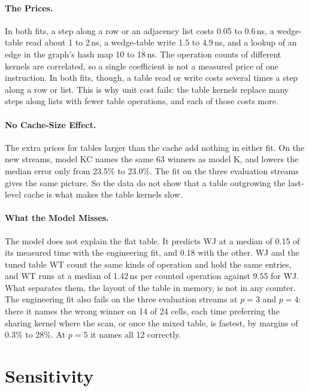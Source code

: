 \paragraph{The Prices.}
In both fits, a step along a row or an adjacency list costs 0.05 to 0.6\,ns, a wedge-table read about 1 to 2\,ns, a wedge-table write 1.5 to 4.9\,ns, and a lookup of an edge in the graph's hash map 10 to 18\,ns.
The operation counts of different kernels are correlated, so a single coefficient is not a measured price of one instruction.
In both fits, though, a table read or write costs several times a step along a row or list. This is why unit cost fails: the table kernels replace many steps along lists with fewer table operations, and each of those costs more.

\paragraph{No Cache-Size Effect.}
The extra prices for tables larger than the cache add nothing in either fit.
On the new streams, model KC names the same 63 winners as model K, and lowers the median error only from 23.5\% to 23.0\%.
The fit on the three evaluation streams gives the same picture.
So the data do not show that a table outgrowing the last-level cache is what makes the table kernels slow.

\paragraph{What the Model Misses.}
The model does not explain the flat table.
It predicts WJ at a median of 0.15 of its measured time with the engineering fit, and 0.18 with the other.
WJ and the tuned table WT count the same kinds of operation and hold the same entries, and WT runs at a median of 1.42\,ns per counted operation against 9.55 for WJ. What separates them, the layout of the table in memory, is not in any counter.
The engineering fit also fails on the three evaluation streams at $p = 3$ and $p = 4$: there it names the wrong winner on 14 of 24 cells, each time preferring the sharing kernel where the scan, or once the mixed table, is fastest, by margins of 0.3\% to 28\%.
At $p = 5$ it names all 12 correctly.

\section{Sensitivity}
\label{sec:sensitivity}


